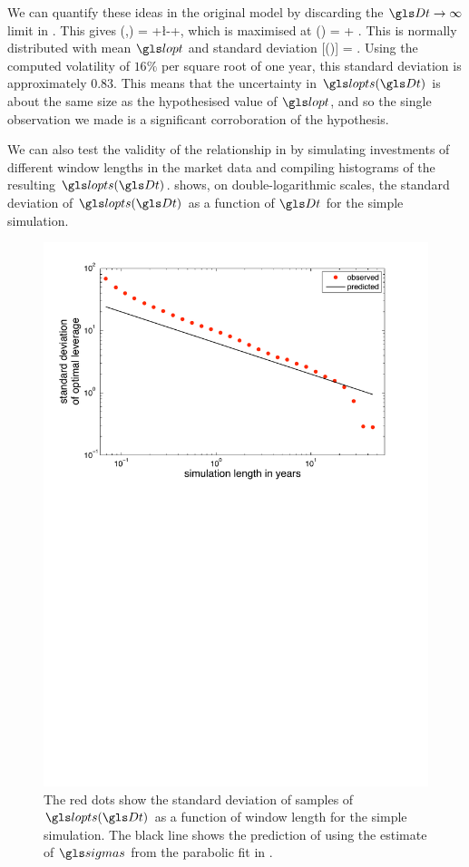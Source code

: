 We can quantify these ideas in the original model by discarding the $\Dt\to\infty$ limit in . This gives
\be
\gm(\xl,\Dt) = \mur+\l\mue-+\frac{\l\sigmas \gW(\Dt)}{\Dt},
\ee
which is maximised at
\be
\lopts(\Dt) = \lopt + \frac{\gW(\Dt)}{\sigmas\Dt}.
\ee
This is normally distributed with mean $\lopt$ and standard deviation
\be
{}[\lopts(\Dt)] = .
\ee
Using the computed volatility of $16\%$ per square root of one year, this standard deviation is approximately 0.83. This means that the uncertainty in $\lopts(\Dt)$ is about the same size as the hypothesised value of $\lopt$, and so the single observation we made is a significant corroboration of the hypothesis.

We can also test the validity of the relationship in  by simulating investments of different window lengths in the market data and compiling histograms of the resulting $\lopts(\Dt)$.  shows, on double-logarithmic scales, the standard deviation of $\lopts(\Dt)$ as a function of $\Dt$ for the simple simulation.
\begin{figure}
\includegraphics[width=\textwidth]{./chapter_4/figs/sme_fig3.pdf}
\caption{The red dots show the standard deviation of samples of $\lopts(\Dt)$ as a function of window length for the simple simulation. The black line shows the prediction of  using the estimate of $\sigmas$ from the parabolic fit in .}
\end{figure}
